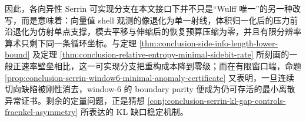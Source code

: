 \noindent
因此，各向异性 Serrin 可实现分支在本文接口下并不只是“Wulff 唯一”的另一种改写，而是意味着：向量值 shell 观测的像退化为单一射线，体积归一化后的压力前沿退化为仿射单点支撑，模去平移与伸缩后的恢复预算压缩为零，并且有限分辨率算术只剩下同一条循环坐标。与定理 \ref{thm:conclusion-side-info-length-lower-bound} 及定理 \ref{thm:conclusion-relative-entropy-minimal-sidebit-rate} 所刻画的一般正速率壁垒相比，这一可实现分支把重构成本降到零级；而在有限窗口端，命题 \ref{prop:conclusion-serrin-window6-minimal-anomaly-certificate} 又表明，一旦连续切向缺陷被刚性消去，window-\(6\) 的 boundary parity 便成为仍可存活的最小离散异常证书。剩余的定量问题，正是猜想 \ref{conj:conclusion-serrin-kl-gap-controls-fraenkel-asymmetry} 所表达的 KL 缺口稳定机制。

\endinput
